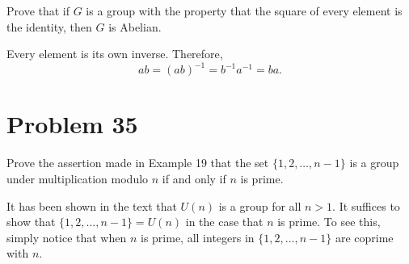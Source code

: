 \documentclass[12pt]{article}
\begin{document}
Prove that if $G$ is a group with the property that the square of every element
is the identity, then $G$ is Abelian.

Every element is its own inverse.  Therefore,
\begin{equation*}
ab = (ab)^{-1} = b^{-1}a^{-1} = ba.
\end{equation*}

\section*{Problem 35}

Prove the assertion made in Example 19 that the set $\{1,2,\dots,n-1\}$
is a group under multiplication modulo $n$ if and only if $n$ is prime.

It has been shown in the text that $U(n)$ is a group for all $n>1$.
It suffices to show that $\{1,2,\dots,n-1\}=U(n)$ in the case that
$n$ is prime.  To see this, simply notice that when $n$ is prime,
all integers in $\{1,2,\dots,n-1\}$ are coprime with $n$.
\end{document}
